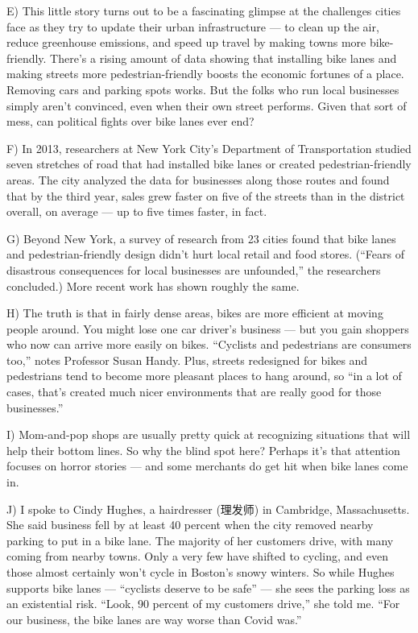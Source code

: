 \documentclass[UTF8,11pt]{ctexart}
\begin{document}
E) This little story turns out to be a fascinating glimpse at the challenges cities face as they try to update their urban infrastructure — to clean up the air, reduce greenhouse emissions, and speed up travel by making towns more bike-friendly. There’s a rising amount of data showing that installing bike lanes and making streets more pedestrian-friendly boosts the economic fortunes of a place. Removing cars and parking spots works. But the folks who run local businesses simply aren’t convinced, even when their own street performs. Given that sort of mess, can political fights over bike lanes ever end?


F) In 2013, researchers at New York City’s Department of Transportation studied seven stretches of road that had installed bike lanes or created pedestrian-friendly areas. The city analyzed the data for businesses along those routes and found that by the third year, sales grew faster on five of the streets than in the district overall, on average — up to five times faster, in fact.


G) Beyond New York, a survey of research from 23 cities found that bike lanes and pedestrian-friendly design didn’t hurt local retail and food stores. (“Fears of disastrous consequences for local businesses are unfounded,” the researchers concluded.) More recent work has shown roughly the same.


H) The truth is that in fairly dense areas, bikes are more efficient at moving people around. You might lose one car driver’s business — but you gain shoppers who now can arrive more easily on bikes. “Cyclists and pedestrians are consumers too,” notes Professor Susan Handy. Plus, streets redesigned for bikes and pedestrians tend to become more pleasant places to hang around, so “in a lot of cases, that’s created much nicer environments that are really good for those businesses.”


I) Mom-and-pop shops are usually pretty quick at recognizing situations that will help their bottom lines. So why the blind spot here? Perhaps it’s that attention focuses on horror stories — and some merchants do get hit when bike lanes come in.


J) I spoke to Cindy Hughes, a hairdresser (理发师) in Cambridge, Massachusetts. She said business fell by at least 40 percent when the city removed nearby parking to put in a bike lane. The majority of her customers drive, with many coming from nearby towns. Only a very few have shifted to cycling, and even those almost certainly won’t cycle in Boston’s snowy winters. So while Hughes supports bike lanes — “cyclists deserve to be safe” — she sees the parking loss as an existential risk. “Look, 90 percent of my customers drive,” she told me. “For our business, the bike lanes are way worse than Covid was.”
\end{document}
